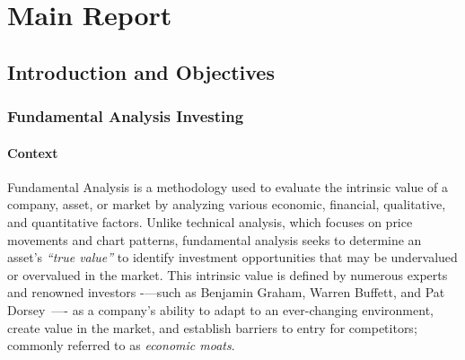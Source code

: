 \documentclass[11pt,english,a4paper,hidelinks]{book}
\begin{document}
\tableofcontents
\newpage

\listoffigures
\newpage

\listoftables


\printglossary[type=\acronymtype, title=Acronyms and Abbreviations]

\clearpage
{}
\setcounter{page}{1}

\part{Main Report}

\chapter{Introduction and Objectives }
\section{Fundamental Analysis Investing}

\subsection{Context}

\noindent Fundamental Analysis is a methodology used to evaluate the intrinsic value of a company, asset, or market by analyzing various economic, financial, qualitative, and quantitative factors. Unlike technical analysis, which focuses on price movements and chart patterns, fundamental analysis seeks to determine an asset's \textit{``true value''} to identify investment opportunities that may be undervalued or overvalued in the market. This intrinsic value is defined by numerous experts and renowned investors -—such as Benjamin Graham, Warren Buffett, and Pat Dorsey~\cite{dorsey2011five}—- as a company's ability to adapt to an ever-changing environment, create value in the market, and establish barriers to entry for competitors; commonly referred to as \textit{economic moats}.
\end{document}

